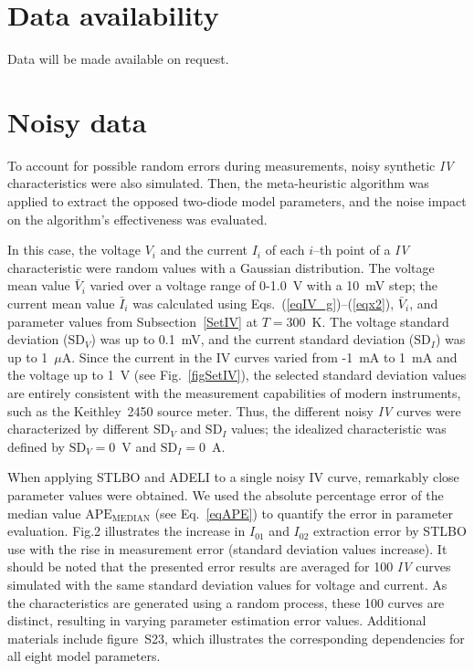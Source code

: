\documentclass[a4paper,fleqn]{cas-sc}
\begin{document}
\section*{Data availability}
Data will be made available on request.


\appendix

\section{Noisy data}\label{Noisy}

To account for possible random errors during measurements,
noisy synthetic \emph{IV} characteristics were also simulated.
Then, the meta-heuristic algorithm was applied to extract the opposed two-diode model parameters,
and the noise impact on the algorithm's effectiveness was evaluated.

In this case, the voltage $V_i$ and the
current $I_i$ of each $i$--th point of a \emph{IV} characteristic were random values with a Gaussian distribution.
The voltage mean value $\bar{V}_i$ varied over a voltage range of 0-1.0~V with a 10~mV step;
the current mean value $\bar{I}_i$ was calculated using Eqs.~(\ref{eqIV_g})--(\ref{eqx2}), $\bar{V}_i$,
and parameter values from Subsection~\ref{SetIV} at $T = 300$~K.
The voltage standard deviation ($\mathrm{SD}_V$) was up to 0.1~mV,
and the current standard deviation ($\mathrm{SD}_I$) was up to 1~$\mu$A.
Since the current in the IV curves varied from -1~mA to 1~mA
and the voltage up to 1~V (see Fig.~\ref{figSetIV}), the selected standard deviation values are entirely consistent
with the measurement capabilities of modern instruments, such as the Keithley~2450 source meter.
Thus, the different noisy \emph{IV} curves were characterized by different $\mathrm{SD}_V$ and $\mathrm{SD}_I$ values;
the idealized characteristic was defined by $\mathrm{SD}_V=0$~V and $\mathrm{SD}_I=0$~A.

When applying STLBO and ADELI to a single noisy IV curve, remarkably close parameter values were obtained.
We used the absolute percentage error of the median value $\mathrm{APE}_\mathrm{MEDIAN}$
(see Eq.~\ref{eqAPE}) to quantify the error in parameter evaluation.
Fig.2 illustrates the increase in $I_{01}$ and $I_{02}$ extraction error by STLBO use
with the rise in measurement error (standard deviation values increase).
It should be noted that the presented error results are averaged for 100 \emph{IV} curves
simulated with the same standard deviation values for voltage and current.
As the characteristics are generated using a random process, these 100 curves are distinct,
resulting in varying parameter estimation error values.
Additional materials include figure~S23, which illustrates the corresponding dependencies
for all eight model parameters.
\end{document}
